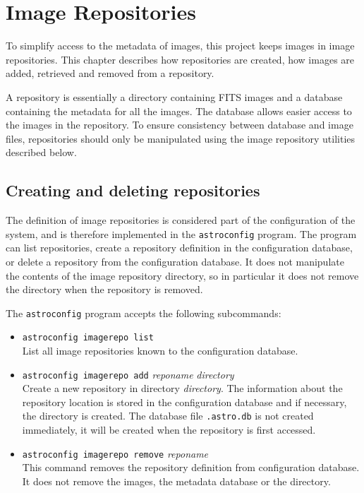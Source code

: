 %
%
%
\chapter{Image Repositories\label{chapter:imagerepo}}
To simplify access to the metadata of images, this project keeps
images in image repositories. 
This chapter describes how repositories are created, how images
are added, retrieved and removed from a repository.

A repository is essentially a directory containing FITS images and
a database containing the metadata for all the images.
The database allows easier access to the images in the repository.
To ensure consistency between database and image files, repositories
should only be manipulated using the image repository utilities
described below.

\section{Creating and deleting repositories}
The definition of image repositories is considered part of the
configuration of the system, and is therefore implemented in the
\texttt{astroconfig} program.
The program can list repositories, create a repository definition
in the configuration database,
or delete a repository from the configuration database.
It does not manipulate the contents of the image repository directory,
so in particular it does not remove the directory when the repository
is removed.

The \texttt{astroconfig} program accepts the following subcommands:
\begin{itemize}
\item
\texttt{astroconfig imagerepo list}
\\
List all image repositories known to the configuration database.
\item
\texttt{astroconfig imagerepo add} \textit{reponame} \textit{directory}
\\
Create a new repository in directory \textit{directory}.
The information about the repository location is stored in the
configuration database and if necessary, the directory is created.
The database file \texttt{.astro.db} is not created immediately, it will
be created when the repository is first accessed.
\item
\texttt{astroconfig imagerepo remove} \textit{reponame}
\\
This command removes the repository definition from configuration
database.
It does not remove the images, the metadata database or the directory.
\end{itemize}

